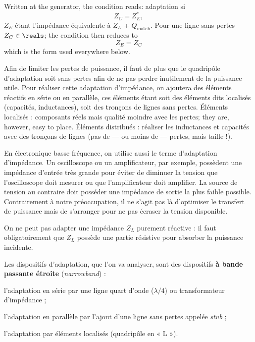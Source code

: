 \begin{prop}
  Written at the generator, the condition reads: adaptation si
  \[Z_C = Z_E^{*},\]
  $Z_E$ étant l'impédance équivalente à $Z_L$ + $Q_{\text{match}}$. Pour une
  ligne sans pertes $Z_C \in \reals$; the condition then reduces to
  \[\boxed{\,Z_E = Z_C\,}\]
  which is the form used everywhere below.
\end{prop}

Afin de limiter les pertes de puissance, il faut de plus que le quadripôle
d'adaptation soit sans pertes afin de ne pas perdre inutilement de la puissance utile.
Pour réaliser cette adaptation d'impédance, on ajoutera des éléments réactifs en série
ou en parallèle, ces éléments étant soit des éléments dits localisés (capacités,
inductances), soit des tronçons de lignes sans pertes. Éléments localisés : composants
réels mais qualité moindre avec les pertes; they are, however, easy to place.
Éléments distribués : réaliser les inductances et capacités avec des tronçons de lignes
(pas de --- ou moins de --- pertes, mais taille !).

\begin{remark}
  En électronique basse fréquence, on utilise aussi le terme d'adaptation
  d'impédance. Un oscilloscope ou un amplificateur, par exemple, possèdent une
  impédance d'entrée très grande pour éviter de diminuer la tension que l'oscilloscope
  doit mesurer ou que l'amplificateur doit amplifier. La source de tension au contraire
  doit posséder une impédance de sortie la plus faible possible. Contrairement à notre
  préoccupation, il ne s'agit pas là d'optimiser le transfert de puissance mais de
  s'arranger pour ne pas écraser la tension disponible.
\end{remark}

\begin{remark}[Warning]
  On ne peut pas adapter une impédance $Z_L$ purement réactive : il faut
  obligatoirement que $Z_L$ possède une partie résistive pour absorber la puissance
  incidente.
\end{remark}

Les dispositifs d'adaptation, que l'on va analyser, sont des dispositifs \textbf{à
bande passante étroite} (\textit{narrowband}) :
\begin{subpart}
  \item l'adaptation en série par une ligne quart d'onde ($\lambda/4$) ou
    transformateur d'impédance ;
  \item l'adaptation en parallèle par l'ajout d'une ligne sans pertes appelée
    \textit{stub} ;
  \item l'adaptation par éléments localisés (quadripôle en « L »).
\end{subpart}

